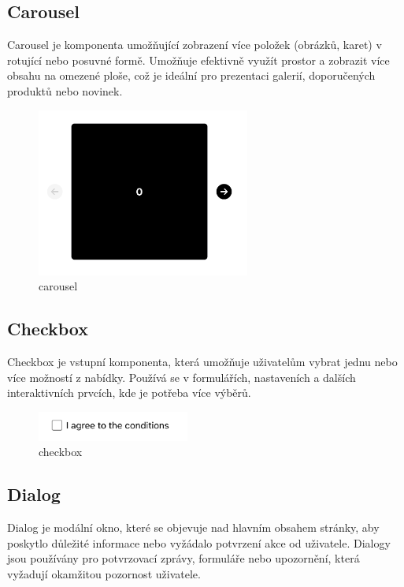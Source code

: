 \subsection{Carousel}
Carousel je komponenta umožňující zobrazení více položek (obrázků, karet) v rotující nebo posuvné formě. Umožňuje efektivně využít prostor a zobrazit více obsahu na omezené ploše, což je ideální pro prezentaci galerií, doporučených produktů nebo novinek.

\begin{figure}[H]
  \centering
  \includegraphics[width=7cm]{images/carousel}
  \captionsetup{justification=centering,margin=2cm}
  \caption{carousel} \label{picture:carousel}
\end{figure}

\subsection{Checkbox}
Checkbox je vstupní komponenta, která umožňuje uživatelům vybrat jednu nebo více možností z nabídky. Používá se v formulářích, nastaveních a dalších interaktivních prvcích, kde je potřeba více výběrů.

\begin{figure}[H]
  \centering
  \includegraphics[width=5cm]{images/checkbox}
  \captionsetup{justification=centering,margin=2cm}
  \caption{checkbox} \label{picture:checkbox}
\end{figure}

\subsection{Dialog}
Dialog je modální okno, které se objevuje nad hlavním obsahem stránky, aby poskytlo důležité informace nebo vyžádalo potvrzení akce od uživatele. Dialogy jsou používány pro potvrzovací zprávy, formuláře nebo upozornění, která vyžadují okamžitou pozornost uživatele.

